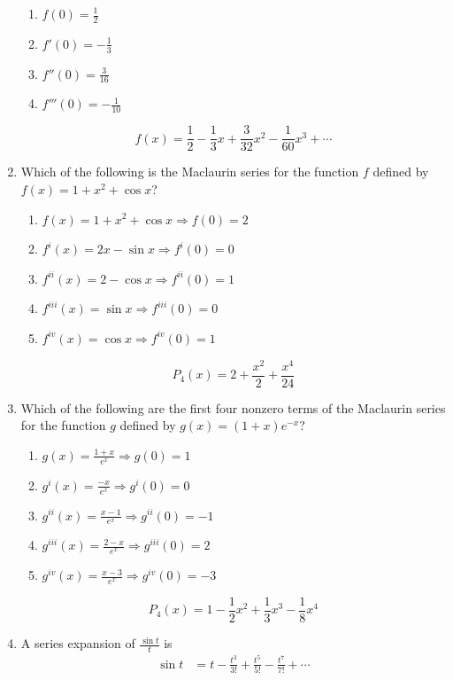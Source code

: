 \documentclass[12pt]{article}
\begin{document}
\begin{enumerate}
	      \begin{enumerate}
	      	\item $f(0) = \frac{1}{2}$
	      	\item $f'(0) = -\frac{1}{3}$
	      	\item $f''(0) = \frac{3}{16}$
	      	\item $f'''(0) = -\frac{1}{10}$
	      \end{enumerate}
	      $$\boxed{f(x) = \frac{1}{2} - \frac{1}{3}x + \frac{3}{32}x^2 -\frac{1}{60}x^3 + \cdots}$$
	\item Which of the following is the Maclaurin series for the function $f$ defined by $f(x)=1+x^2+\cos x$?
	      \begin{enumerate}
	      	\item $f(x) = 1+ x^2 + \cos x \Longrightarrow f(0) = 2$
	      	\item $f^{i}(x) = 2x - \sin x \Longrightarrow f^{i}(0) = 0$
	      	\item $f^{ii}(x) = 2- \cos x \Longrightarrow f^{ii}(0) = 1$
	      	\item $f^{iii}(x) = \sin x \Longrightarrow f^{iii}(0) = 0$
	      	\item $f^{iv}(x) = \cos x \Longrightarrow f^{iv}(0) = 1$
	      \end{enumerate}
	      $$\boxed{P_{4}(x) = 2+\frac{x^2}{2} + \frac{x^4}{24}}$$
	\item Which of the following are the first four nonzero terms of the Maclaurin series for the function $g$ defined by $g(x)=(1+x)e^{-x}$?
	      \begin{enumerate}
	      	\item $g(x) = \frac{1+x}{e^x} \Longrightarrow g(0) = 1$
	      	\item $g^{i}(x) = \frac{-x}{e^x} \Longrightarrow g^{i}(0) = 0$
	      	\item $g^{ii}(x) = \frac{x-1}{e^x} \Longrightarrow g^{ii}(0) = -1$
	      	\item $g^{iii}(x) = \frac{2-x}{e^x} \Longrightarrow g^{iii}(0) = 2$
	      	\item $g^{iv}(x) = \frac{x-3}{e^x} \Longrightarrow g^{iv}(0) = -3$
	      \end{enumerate}
	      $$\boxed{P_{4}(x) = 1- \frac{1}{2}x^2 + \frac{1}{3}x^3 - \frac{1}{8} x^4}$$
	\item A series expansion of $\frac{\sin t}{t}$ is
	      \begin{align*}
	      	\sin t           & = t - \frac{t^3}{3!} + \frac{t^5}{5!} - \frac{t^7}{7!} + \cdots         \\

\end{align*}
\end{enumerate}
\end{document}
